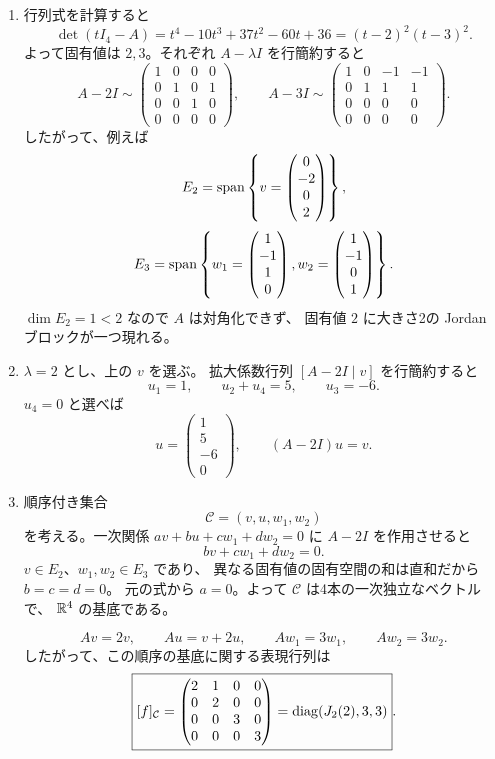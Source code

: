 \begin{enumerate}
  \item 行列式を計算すると
  \[
  \det(tI_4-A)=t^4-10t^3+37t^2-60t+36
  =(t-2)^2(t-3)^2.
  \]
  よって固有値は \(2,3\)。それぞれ \(A-\lambda I\) を行簡約すると
  \[
  A-2I\sim
  \begin{pmatrix}
  1&0&0&0\\
  0&1&0&1\\
  0&0&1&0\\
  0&0&0&0
  \end{pmatrix},
  \qquad
  A-3I\sim
  \begin{pmatrix}
  1&0&-1&-1\\
  0&1&1&1\\
  0&0&0&0\\
  0&0&0&0
  \end{pmatrix}.
  \]
  したがって、例えば
  \[
  E_2=\operatorname{span}\left\{
  v=\begin{pmatrix}0\\-2\\0\\2\end{pmatrix}
  \right\},
  \]
  \[
  E_3=\operatorname{span}\left\{
  w_1=\begin{pmatrix}1\\-1\\1\\0\end{pmatrix},
  w_2=\begin{pmatrix}1\\-1\\0\\1\end{pmatrix}
  \right\}.
  \]
  \(\dim E_2=1<2\) なので \(A\) は対角化できず、
  固有値 \(2\) に大きさ2の Jordan ブロックが一つ現れる。

  \item \(\lambda=2\) とし、上の \(v\) を選ぶ。
  拡大係数行列 \([A-2I\mid v]\) を行簡約すると
  \[
  u_1=1,\qquad u_2+u_4=5,\qquad u_3=-6.
  \]
  \(u_4=0\) と選べば
  \[
  \boxed{u=\begin{pmatrix}1\\5\\-6\\0\end{pmatrix}},
  \qquad (A-2I)u=v.
  \]

  \item 順序付き集合
  \[
  \mathcal C=(v,u,w_1,w_2)
  \]
  を考える。一次関係
  \(av+bu+cw_1+dw_2=0\) に \(A-2I\) を作用させると
  \[
  bv+cw_1+dw_2=0.
  \]
  \(v\in E_2\)、\(w_1,w_2\in E_3\) であり、
  異なる固有値の固有空間の和は直和だから \(b=c=d=0\)。
  元の式から \(a=0\)。よって \(\mathcal C\) は4本の一次独立なベクトルで、
  \(\mathbb R^4\) の基底である。

  \[
  Av=2v,\qquad Au=v+2u,\qquad Aw_1=3w_1,\qquad Aw_2=3w_2.
  \]
  したがって、この順序の基底に関する表現行列は
  \[
  \boxed{
  [f]_{\mathcal C}=
  \begin{pmatrix}
  2&1&0&0\\
  0&2&0&0\\
  0&0&3&0\\
  0&0&0&3
  \end{pmatrix}
  =\operatorname{diag}(J_2(2),3,3)}.
  \]
\end{enumerate}

